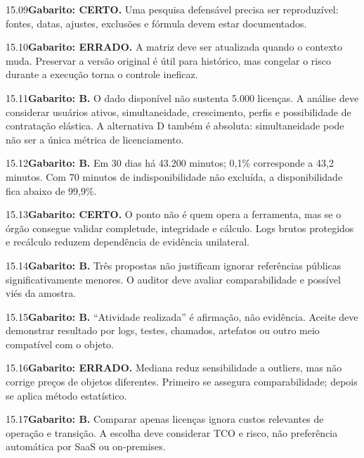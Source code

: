 \begin{solucao}{15.09}\textbf{Gabarito: CERTO.} Uma pesquisa defensável precisa ser reproduzível: fontes, datas, ajustes, exclusões e fórmula devem estar documentados.\end{solucao}
\begin{solucao}{15.10}\textbf{Gabarito: ERRADO.} A matriz deve ser atualizada quando o contexto muda. Preservar a versão original é útil para histórico, mas congelar o risco durante a execução torna o controle ineficaz.\end{solucao}

\begin{solucao}{15.11}\textbf{Gabarito: B.} O dado disponível não sustenta 5.000 licenças. A análise deve considerar usuários ativos, simultaneidade, crescimento, perfis e possibilidade de contratação elástica. A alternativa D também é absoluta: simultaneidade pode não ser a única métrica de licenciamento.\end{solucao}
\begin{solucao}{15.12}\textbf{Gabarito: B.} Em 30 dias há 43.200 minutos; 0,1\% corresponde a 43,2 minutos. Com 70 minutos de indisponibilidade não excluída, a disponibilidade fica abaixo de 99,9\%.\end{solucao}
\begin{solucao}{15.13}\textbf{Gabarito: CERTO.} O ponto não é quem opera a ferramenta, mas se o órgão consegue validar completude, integridade e cálculo. Logs brutos protegidos e recálculo reduzem dependência de evidência unilateral.\end{solucao}
\begin{solucao}{15.14}\textbf{Gabarito: B.} Três propostas não justificam ignorar referências públicas significativamente menores. O auditor deve avaliar comparabilidade e possível viés da amostra.\end{solucao}
\begin{solucao}{15.15}\textbf{Gabarito: B.} ``Atividade realizada'' é afirmação, não evidência. Aceite deve demonstrar resultado por logs, testes, chamados, artefatos ou outro meio compatível com o objeto.\end{solucao}
\begin{solucao}{15.16}\textbf{Gabarito: ERRADO.} Mediana reduz sensibilidade a outliers, mas não corrige preços de objetos diferentes. Primeiro se assegura comparabilidade; depois se aplica método estatístico.\end{solucao}
\begin{solucao}{15.17}\textbf{Gabarito: B.} Comparar apenas licenças ignora custos relevantes de operação e transição. A escolha deve considerar TCO e risco, não preferência automática por SaaS ou on-premises.\end{solucao}

